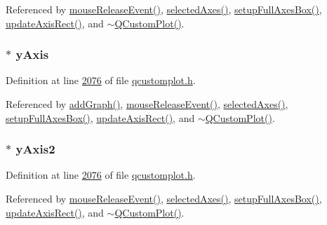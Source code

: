 Referenced by \hyperlink{a00115_source_l07691}{mouse\+Release\+Event()}, \hyperlink{a00115_source_l07154}{selected\+Axes()}, \hyperlink{a00115_source_l07265}{setup\+Full\+Axes\+Box()}, \hyperlink{a00115_source_l08116}{update\+Axis\+Rect()}, and \hyperlink{a00115_source_l05836}{$\sim$\+Q\+Custom\+Plot()}.

\hypertarget{a00116_af168096ce67002b1fbce18ae5dd1b652}{
\subsubsection[{y\+Axis}]{ $\ast$ y\+Axis}}\label{a00116_af168096ce67002b1fbce18ae5dd1b652}


Definition at line \hyperlink{a00116_source_l02076}{2076} of file \hyperlink{a00116_source}{qcustomplot.\+h}.



Referenced by \hyperlink{a00115_source_l06688}{add\+Graph()}, \hyperlink{a00115_source_l07691}{mouse\+Release\+Event()}, \hyperlink{a00115_source_l07154}{selected\+Axes()}, \hyperlink{a00115_source_l07265}{setup\+Full\+Axes\+Box()}, \hyperlink{a00115_source_l08116}{update\+Axis\+Rect()}, and \hyperlink{a00115_source_l05836}{$\sim$\+Q\+Custom\+Plot()}.

\hypertarget{a00116_a4fd6679232da7da0a1ae4e1b6ae83d6e}{
\subsubsection[{y\+Axis2}]{ $\ast$ y\+Axis2}}\label{a00116_a4fd6679232da7da0a1ae4e1b6ae83d6e}


Definition at line \hyperlink{a00116_source_l02076}{2076} of file \hyperlink{a00116_source}{qcustomplot.\+h}.



Referenced by \hyperlink{a00115_source_l07691}{mouse\+Release\+Event()}, \hyperlink{a00115_source_l07154}{selected\+Axes()}, \hyperlink{a00115_source_l07265}{setup\+Full\+Axes\+Box()}, \hyperlink{a00115_source_l08116}{update\+Axis\+Rect()}, and \hyperlink{a00115_source_l05836}{$\sim$\+Q\+Custom\+Plot()}.


